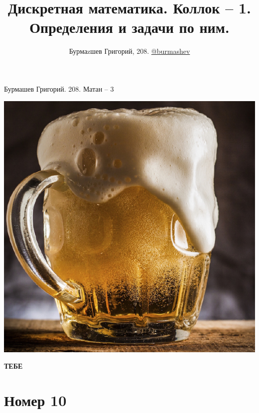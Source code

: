 \documentclass[a4paper,12pt]{article}
\author{Бурмаzшев Григорий, 208. \href{https://teleg.run/burmashev}{@burmashev}}
\title{Дискретная математика. Коллок -- 1. Определения и задачи по ним.}
\begin{document}
{\Large \begin{center}
Бурмашев Григорий.  208. Матан -- 3
\end{center}}
\begin{center}
\includegraphics[scale=1]{pivo.png}
\end{center}
\begin{center}
{\Huge \textbf{ТЕБЕ}}
\end{center}

\newpage
\section*{Номер 10}
\end{document}
